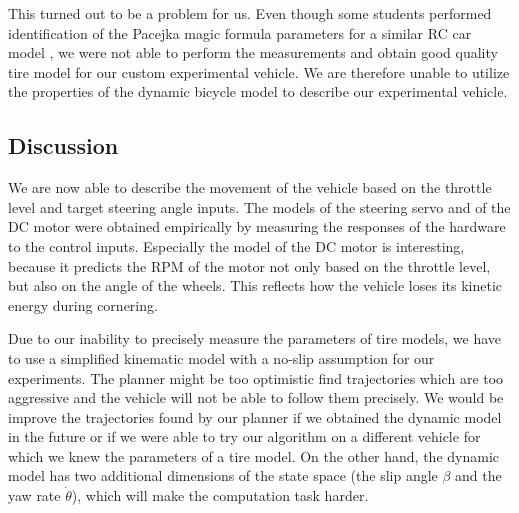 This turned out to be a problem for us. Even though some students performed identification of the Pacejka magic formula parameters for a similar RC car model \cite{rc_identification, rc_identification_2}, we were not able to perform the measurements and obtain good quality tire model for our custom experimental vehicle. We are therefore unable to utilize the properties of the dynamic bicycle model to describe our experimental vehicle.

\subsection{Discussion}

We are now able to describe the movement of the vehicle based on the throttle level and target steering angle inputs. The models of the steering servo and of the DC motor were obtained empirically by measuring the responses of the hardware to the control inputs. Especially the model of the DC motor is interesting, because it predicts the RPM of the motor not only based on the throttle level, but also on the angle of the wheels. This reflects how the vehicle loses its kinetic energy during cornering.

Due to our inability to precisely measure the parameters of tire models, we have to use a simplified kinematic model with a no-slip assumption for our experiments. The planner might be too optimistic find trajectories which are too aggressive and the vehicle will not be able to follow them precisely. We would be improve the trajectories found by our planner if we obtained the dynamic model in the future or if we were able to try our algorithm on a different vehicle for which we knew the parameters of a tire model. On the other hand, the dynamic model has two additional dimensions of the state space (the slip angle $\beta$ and the yaw rate $\dot{\theta}$), which will make the computation task harder.
